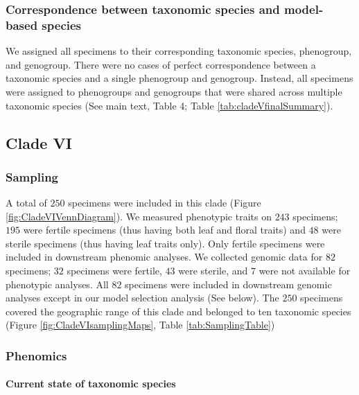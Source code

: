 \documentclass[
  11pt,
]{article}
\begin{document}
\hypertarget{correspondence-between-taxonomic-species-and-model-based-species-4}{%
\subsubsection{Correspondence between taxonomic species and model-based species}\label{correspondence-between-taxonomic-species-and-model-based-species-4}}

We assigned all specimens to their corresponding taxonomic species, phenogroup, and genogroup. There were no cases of perfect correspondence between a taxonomic species and a single phenogroup and genogroup. Instead, all specimens were assigned to phenogroups and genogroups that were shared across multiple taxonomic species (See main text, Table 4; Table \ref{tab:cladeVfinalSummary}).

\hypertarget{clade-vi}{%
\subsection{Clade VI}\label{clade-vi}}

\hypertarget{sampling-6}{%
\subsubsection{Sampling}\label{sampling-6}}

A total of \(250\) specimens were included in this clade (Figure \ref{fig:CladeVIVennDiagram}). We measured phenotypic traits on \(243\) specimens; \(195\) were fertile specimens (thus having both leaf and floral traits) and \(48\) were sterile specimens (thus having leaf traits only). Only fertile specimens were included in downstream phenomic analyses. We collected genomic data for \(82\) specimens; \(32\) specimens were fertile, \(43\) were sterile, and \(7\) were not available for phenotypic analyses. All \(82\) specimens were included in downstream genomic analyses except in our model selection analysis (See below). The \(250\) specimens covered the geographic range of this clade and belonged to ten taxonomic species (Figure \ref{fig:CladeVIsamplingMaps}, Table \ref{tab:SamplingTable})

\hypertarget{phenomics-6}{%
\subsubsection{Phenomics}\label{phenomics-6}}

\hypertarget{current-state-of-taxonomic-species-5}{%
\paragraph{Current state of taxonomic species}\label{current-state-of-taxonomic-species-5}}
\end{document}
